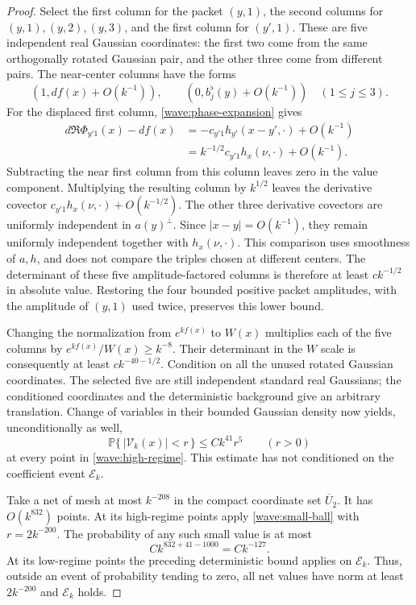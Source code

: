 \begin{proof}
Select the first column for the packet $(y,1)$, the second columns for
$(y,1),(y,2),(y,3)$, and the first column for $(y',1)$. These are five
independent real Gaussian coordinates: the first two come from the
same orthogonally rotated Gaussian pair, and the other three come
from different pairs. The near-center columns have the forms
\[
 (1,df(x)+O(k^{-1})),\qquad
 (0,b_j^\flat(y)+O(k^{-1}))\quad(1\le j\le3).
\]
For the displaced first column, \eqref{wave:phase-expansion} gives
\begin{align*}
 d\Re\Phi_{y'1}(x)-df(x)
 &=-c_{y'1}h_{y'}(x-y',\cdot)+O(k^{-1})\\
 &=k^{-1/2}c_{y'1}h_x(\nu,\cdot)+O(k^{-1}).
\end{align*}
Subtracting the near first column from this column leaves zero in
the value component. Multiplying the resulting column by $k^{1/2}$
leaves the derivative covector $c_{y'1}h_x(\nu,\cdot)+O(k^{-1/2})$.
The other three derivative covectors are uniformly independent in
$a(y)^\perp$. Since $|x-y|=O(k^{-1})$, they remain uniformly
independent together with $h_x(\nu,\cdot)$. This comparison uses
smoothness of $a,h$, and does not compare the triples chosen at
different centers. The determinant of these five amplitude-factored
columns is therefore at least $ck^{-1/2}$ in absolute value.
Restoring the four bounded positive packet amplitudes, with the
amplitude of $(y,1)$ used twice, preserves this lower bound.

Changing the normalization from $e^{kf(x)}$ to $W(x)$ multiplies
each of the five columns by $e^{kf(x)}/W(x)\ge k^{-8}$. Their
determinant in the $W$ scale is consequently at least
$ck^{-40-1/2}$. Condition on all the unused rotated Gaussian
coordinates. The selected five are still independent standard real
Gaussians; the conditioned coordinates and the deterministic background
give an arbitrary translation. Change of variables in their bounded
Gaussian density now yields, unconditionally as well,
\begin{equation}
 \mathbb P\{\,|\mathcal V_k(x)|<r\,\}
       \le C k^{41}r^5\qquad(r>0)
 \label{wave:small-ball}
\end{equation}
at every point in \eqref{wave:high-regime}. This estimate has not
conditioned on the coefficient event $\mathcal E_k$.

Take a net of mesh at most $k^{-208}$ in the compact coordinate set
$\overline U_2$. It has $O(k^{832})$ points. At its high-regime points
apply \eqref{wave:small-ball} with $r=2k^{-200}$. The probability of
any such small value is at most
\[
 C k^{832+41-1000}=Ck^{-127}.
\]
At its low-regime points the preceding deterministic bound applies on
$\mathcal E_k$. Thus, outside an event of probability tending to zero,
all net values have norm at least $2k^{-200}$ and $\mathcal E_k$ holds.


\end{proof}
